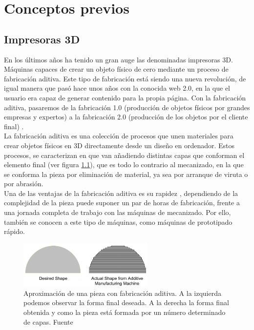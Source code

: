 \chapter{Conceptos previos}
\label{cap:conceptos}

\section{Impresoras 3D}
\label{sec:immpresoras}

En los últimos años ha tenido un gran auge las denominadas impresoras 3D. Máquinas capaces de crear un objeto físico de cero mediante un proceso de fabricación aditiva. Este tipo de fabricación está siendo una nueva revolución, de igual manera que pasó hace unos años con la conocida web 2.0, en la que el usuario era capaz de generar contenido para la propia página. Con la fabricación aditiva, pasaremos de la fabricación 1.0 (producción de objetos físicos por grandes empresas y expertos) a la fabricación 2.0 (producción de los objetos por el cliente final) \cite{additive}.\\

La fabricación aditiva es una colección de procesos que unen materiales para crear objetos físicos en 3D directamente desde un diseño en ordenador. Estos procesos, se caracterizan en que van añadiendo distintas capas que conforman el elemento final (ver figura \ref{fig:approach_am}), que es todo lo contrario al mecanizado, en la que se conforma la pieza por eliminación de material, ya sea por arranque de viruta o por abrasión.\\

Una de las ventajas de la fabricación aditiva es su rapidez \cite{additivevssubtractive}, dependiendo de la complejidad de la pieza puede suponer un par de horas de fabricación, frente a una jornada completa de trabajo con las máquinas de mecanizado. Por ello, también se conocen a este tipo de máquinas, como máquinas de prototipado rápido.\\

\begin{figure}[H]
    \centering
    \includegraphics[width=0.6\textwidth]{images/aproximacion_am.png}
    \caption[Aproximación de una pieza con fabricación aditiva.]{Aproximación de una pieza con fabricación aditiva. A la izquierda podemos observar la forma final deseada. A la derecha la forma final obtenida y como la pieza está formada por un número determinado de capas. Fuente \cite{additive}}
    \label{fig:approach_am}
\end{figure}

